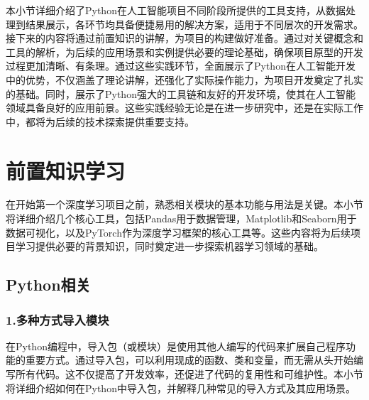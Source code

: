本小节详细介绍了Python在人工智能项目不同阶段所提供的工具支持，从数据处理到结果展示，各环节均具备便捷易用的解决方案，适用于不同层次的开发需求。接下来的内容将通过前置知识的讲解，为项目的构建做好准备。通过对关键概念和工具的解析，为后续的应用场景和实例提供必要的理论基础，确保项目原型的开发过程更加清晰、有条理。通过这些实践环节，全面展示了Python在人工智能开发中的优势，不仅涵盖了理论讲解，还强化了实际操作能力，为项目开发奠定了扎实的基础。同时，展示了Python强大的工具链和友好的开发环境，使其在人工智能领域具备良好的应用前景。这些实践经验无论是在进一步研究中，还是在实际工作中，都将为后续的技术探索提供重要支持。

\section{前置知识学习}

在开始第一个深度学习项目之前，熟悉相关模块的基本功能与用法是关键。本小节将详细介绍几个核心工具，包括Pandas用于数据管理，Matplotlib和Seaborn用于数据可视化，以及PyTorch作为深度学习框架的核心工具等。这些内容将为后续项目学习提供必要的背景知识，同时奠定进一步探索机器学习领域的基础。

\subsection{Python相关}

\subsubsection{1.多种方式导入模块}

在Python编程中，导入包（或模块）是使用其他人编写的代码来扩展自己程序功能的重要方式。通过导入包，可以利用现成的函数、类和变量，而无需从头开始编写所有代码。这不仅提高了开发效率，还促进了代码的复用性和可维护性。本小节将详细介绍如何在Python中导入包，并解释几种常见的导入方式及其应用场景。


